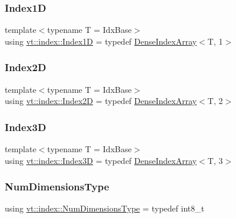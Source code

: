 \subsubsection{\texorpdfstring{Index1D}{Index1D}}
{\footnotesize\ttfamily template$<$typename T  = Idx\+Base$>$ \\
using \hyperlink{namespacevt_1_1index_a091a4f5a7a2c993d9727eaa60cf67d81}{vt\+::index\+::\+Index1D} = typedef \hyperlink{structvt_1_1index_1_1_dense_index_array}{Dense\+Index\+Array}$<$T, 1$>$}

\mbox{\label{namespacevt_1_1index_a8373801efc8343f24d6e8ba57df40a69}} 
\subsubsection{\texorpdfstring{Index2D}{Index2D}}
{\footnotesize\ttfamily template$<$typename T  = Idx\+Base$>$ \\
using \hyperlink{namespacevt_1_1index_a8373801efc8343f24d6e8ba57df40a69}{vt\+::index\+::\+Index2D} = typedef \hyperlink{structvt_1_1index_1_1_dense_index_array}{Dense\+Index\+Array}$<$T, 2$>$}

\mbox{\label{namespacevt_1_1index_a2c09a09f7346d370a0bcbbfb0d4459cd}} 
\subsubsection{\texorpdfstring{Index3D}{Index3D}}
{\footnotesize\ttfamily template$<$typename T  = Idx\+Base$>$ \\
using \hyperlink{namespacevt_1_1index_a2c09a09f7346d370a0bcbbfb0d4459cd}{vt\+::index\+::\+Index3D} = typedef \hyperlink{structvt_1_1index_1_1_dense_index_array}{Dense\+Index\+Array}$<$T, 3$>$}

\mbox{\label{namespacevt_1_1index_a97aa9370711425850c86bcb7a20d73e8}} 
\subsubsection{\texorpdfstring{Num\+Dimensions\+Type}{NumDimensionsType}}
{\footnotesize\ttfamily using \hyperlink{namespacevt_1_1index_a97aa9370711425850c86bcb7a20d73e8}{vt\+::index\+::\+Num\+Dimensions\+Type} = typedef int8\+\_\+t}



